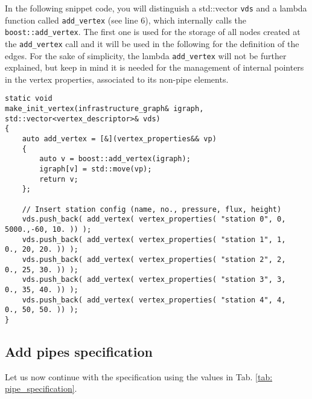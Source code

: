 In the following snippet code, you will distinguish a std::vector \texttt{vds} and a lambda function called \texttt{add\_vertex} (see line 6), which internally calls the \texttt{boost::add\_vertex}. The first one is used for the storage of all nodes created at the \texttt{add\_vertex} call  and it will be used in the following for the definition of the edges. For the sake of simplicity, the lambda \texttt{add\_vertex} will not be further explained, but keep in mind it  is needed for the management of internal pointers in the vertex properties, associated to its non-pipe elements. 

\begin{verbatim}
static void
make_init_vertex(infrastructure_graph& igraph, std::vector<vertex_descriptor>& vds)
{
    auto add_vertex = [&](vertex_properties&& vp) 
    {
        auto v = boost::add_vertex(igraph);
        igraph[v] = std::move(vp);
        return v;
    };

    // Insert station config (name, no., pressure, flux, height)
    vds.push_back( add_vertex( vertex_properties( "station 0", 0, 5000.,-60, 10. )) );
    vds.push_back( add_vertex( vertex_properties( "station 1", 1,    0., 20, 20. )) );
    vds.push_back( add_vertex( vertex_properties( "station 2", 2,    0., 25, 30. )) );
    vds.push_back( add_vertex( vertex_properties( "station 3", 3,    0., 35, 40. )) );
    vds.push_back( add_vertex( vertex_properties( "station 4", 4,    0., 50, 50. )) );
}
\end{verbatim}

\subsection{Add pipes specification}
Let us now continue with the  specification using the values in Tab. \ref{tab: pipe_specification}. 



